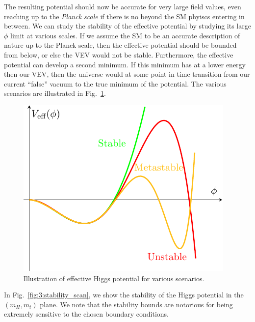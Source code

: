 The resulting potential should now be accurate for very large field values, even reaching up to the \textit{Planck scale} if there is no beyond the \acs{SM} phyiscs entering in between. We can study the stability of the effective potential by studying its large $\phi$ limit at various scales. If we assume the \acs{SM} to be an accurate description of nature up to the Planck scale, then the effective potential should be bounded from below, or else the \acs{VEV} would not be stable. Furthermore, the effective potential can develop a second minimum. If this minimum has at a lower energy then our \acs{VEV}, then the universe would at some point in time transition from our current ``false'' vacuum to the true minimum of the potential. The various scenarios are illustrated in Fig.~\ref{fig:3:Veff_illustration}.
\begin{figure}[ht]
\centering
\includegraphics[scale=1.1]{Images/Veff_illustration.pdf}
\caption{Illustration of effective Higgs potential for various scenarios.}
\label{fig:3:Veff_illustration}
\end{figure}
In Fig.~\ref{fig:3:stability_scan}, we show the stability of the Higgs potential in the $(m_H, m_t)$ plane. We note that the stability bounds are notorious for being extremely sensitive to the chosen boundary conditions.
